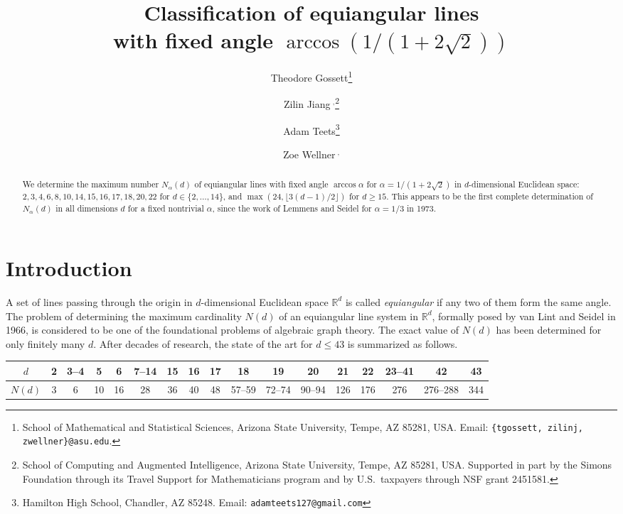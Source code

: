 \documentclass[11pt]{article}
\title{Classification of equiangular lines\\with fixed angle $\arccos(1/(1+2\sqrt2))$}
\author{
    Theodore Gossett\thanks{School of Mathematical and Statistical Sciences, Arizona State University, Tempe, AZ 85281, USA. Email: {\tt \{tgossett, zilinj, zwellner\}@asu.edu}.} \and Zilin Jiang\footnotemark[1]${\ }^{,}$\thanks{School of Computing and Augmented Intelligence, Arizona State University, Tempe, AZ 85281, USA. Supported in part by the Simons Foundation through its Travel Support for Mathematicians program and by U.S.\ taxpayers through NSF grant 2451581.} \and Adam Teets\thanks{Hamilton High School, Chandler, AZ 85248. Email: {\tt adamteets127@gmail.com}} \and Zoe Wellner\footnotemark[1]${\ }^{,}$
}
\date{}
\theoremstyle{definition}
\theoremstyle{remark}
\newcommand{\R}{\mathbb{R}}
\begin{document}
\maketitle

\begin{abstract}
	We determine the maximum number $N_\alpha(d)$ of equiangular lines with fixed angle $\arccos\alpha$ for $\alpha = 1/(1+2\sqrt2)$ in $d$-dimensional Euclidean space: $2,3,4,6,8,10,14,15,16,17,18,20,22$ for $d \in \{2,\dots,14\}$, and $\max(24, \lfloor 3(d-1)/2 \rfloor)$ for $d \ge 15$. This appears to be the first complete determination of $N_\alpha(d)$ in all dimensions $d$ for a fixed nontrivial $\alpha$, since the work of Lemmens and Seidel for $\alpha = 1/3$ in 1973.
\end{abstract}

\section{Introduction} \label{sec:intro}

A set of lines passing through the origin in $d$-dimensional Euclidean space $\R^d$ is called \emph{equiangular} if any two of them form the same angle. The problem of determining the maximum cardinality $N(d)$ of an equiangular line system in $\R^d$, formally posed by van Lint and Seidel \cite{vLS66} in 1966, is considered to be one of the foundational problems of algebraic graph theory. The exact value of $N(d)$ has been determined for only finitely many $d$. After decades of research, the state of the art for $d \le 43$ is summarized as follows.

\begin{center}
    \setlength{\tabcolsep}{4pt}
    \begin{tabular}{ccccccccccccccccc}
        $d$ & 2 & 3--4 & 5 & 6 & 7--14 & 15 & 16 & 17 & 18 & 19 & 20 & 21 & 22 & 23--41 & 42 & 43\\
        \hline
        $N(d)$ & 3 & 6 & 10 & 16 & 28 & 36 & 40 & 48 & 57--59 & 72--74 & 90--94 & 126 & 176 & 276 & 276--288 & 344
    \end{tabular}
\end{center}
\end{document}
